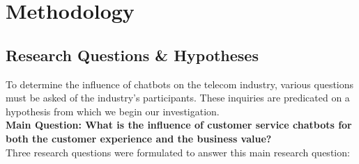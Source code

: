 \mainmatter
\pagestyle{headings}

\chapter{Methodology}
\label{ch:methodology}
\section{Research Questions \& Hypotheses}
To determine the influence of chatbots on the telecom industry, various questions must be asked of the industry's participants. These inquiries are predicated on a hypothesis from which we begin our investigation.\\
\break
\textbf{Main Question: What is the influence of customer service chatbots for both the customer experience and the business value?}\\
\break 
Three research questions were formulated to answer this main research question:

